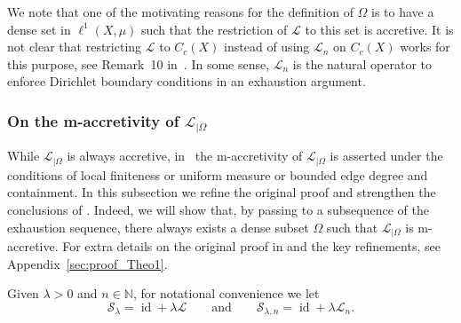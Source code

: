 \documentclass[letterpaper]{article}
\theoremstyle{definition}
\theoremstyle{named}
\numberwithin{equation}{section}
\newcommand{\N}{\mathbb{N}}
\newcommand{\id}{\operatorname{id}}
\newcommand{\Deltaphi}{\mathcal{L}}
\newcommand{\Deltaphiom}{\Deltaphi_{|\Omega}}
\newcommand{\Lmin}{\mathcal{L}_{n}}
\begin{document}
We note that one of the motivating reasons for the definition
of $\Omega$ is to have a dense set in $\ell^1(X,\mu)$ 
such that the restriction of $\Deltaphi$ to this set is accretive. 
It is not clear that restricting $\Deltaphi$
to $C_c(X)$ instead of using $\Deltaphi_n$ on $C_c(X)$ works for this purpose, see Remark~10 in~\cite{bianchi2022generalized}. In some sense, $\Deltaphi_n$ is the natural operator to enforce Dirichlet boundary conditions in an exhaustion argument.









\subsubsection{\texorpdfstring{On the m-accretivity of $\Deltaphiom$}{On the m-accretivity of Delta Phi on Omega}}\label{sec:m-accretivity_Lomega}
While $\Deltaphiom$ is always accretive, 
in~\cite[Theorem 1]{bianchi2022generalized} the m-accretivity of $\Deltaphiom$
is asserted under the conditions of local finiteness or uniform measure or 
bounded edge degree and containment.  In this subsection we  refine the original proof and  strengthen the conclusions of \cite[Theorem 1]{bianchi2022generalized}.  
Indeed, we will show 
that, by passing to a subsequence of the exhaustion sequence, 
there always exists a dense subset $\Omega$ such that
$\Deltaphiom$ is m-accretive. For extra details on the original 
proof in \cite{bianchi2022generalized} and the key refinements, see Appendix~\ref{sec:proof_Theo1}.



Given $\lambda>0$ and $n \in \N$, for notational convenience we let 
$$
\mathcal{S}_\lambda = \id + \lambda \Deltaphi \qquad \mbox{and} \qquad \mathcal{S}_{\lambda,n} = \id + \lambda \Lmin.
$$
\end{document}
